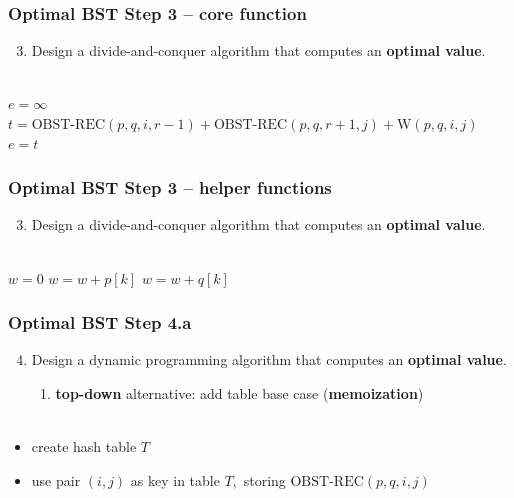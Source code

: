 \documentclass{beamer}
\newcommand{\stanza}{ \\~\ }
\begin{document}
\begin{frame} \frametitle{Optimal BST Step 3 -- core function}
  \begin{enumerate}
    \setcounter{enumi}{2}
    \item Design a divide-and-conquer algorithm that computes an \textbf{optimal value}.
    \stanza
  \end{enumerate}

  {\scriptsize
  \begin{algorithmic}[1]
      \State {}
    \EndIf
    \State $e = \infty$
      \State $t = \text{OBST-REC}(p, q, i, r-1) + \text{OBST-REC}(p, q, r+1, j) + \text{W}(p, q, i, j)$
        \State $e = t$
      \EndIf
    \EndFor
    \State {}
    \EndFunction
  \end{algorithmic}
  }
\end{frame}

\begin{frame} \frametitle{Optimal BST Step 3 -- helper functions}
  \begin{enumerate}
    \setcounter{enumi}{2}
    \item Design a divide-and-conquer algorithm that computes an \textbf{optimal value}.
    \stanza
  \end{enumerate}

  {\scriptsize
  \begin{algorithmic}[1]
      \State {}
    \EndFunction
      \State $w = 0$
        \State $w = w + p[k]$
      \EndFor
        \State $w = w + q[k]$
      \EndFor
      \State {}
    \EndFunction
  \end{algorithmic}
  }
\end{frame}

\begin{frame} \frametitle{Optimal BST Step 4.a}
  \begin{enumerate}
    \setcounter{enumi}{3}
    \item Design a dynamic programming algorithm that computes an \textbf{optimal value}.
    \begin{enumerate}
      \item \textbf{top-down} alternative: add table base case (\textbf{memoization})
      \stanza
    \end{enumerate}
\end{enumerate}

\begin{itemize}
  \item create hash table $T$
  \item use pair $(i, j)$ as key in table $T,$ storing $\text{OBST-REC}(p, q, i, j)$
\end{itemize}
\end{frame}
\end{document}
